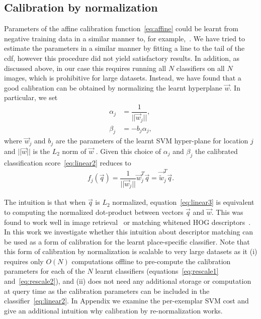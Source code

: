   \subsection{Calibration by normalization}
  \label{sec:calibration_by_renormalization}
  Parameters of the affine calibration function~\eqref{eq:affine} could be learnt from negative training data in a similar manner to, for example,~\cite{Aubry14}. 
  We have tried to estimate the parameters in a similar manner by fitting a line to the tail of the cdf, however this procedure did not yield satisfactory results.
  In addition, as discussed above, in our case this requires running all $N$ classifiers on all $N$ images, which is prohibitive for large datasets.
  Instead, we have found that a good calibration can be obtained by normalizing the learnt hyperplane $\vec{w}$. In particular, we set 
    \begin{align}
      \label{eq:rescale1}
      \alpha_j &= \dfrac{1}{||\vec{w}_j||},\\ 
      \label{eq:rescale2}
      \beta_j &=  -b_j \alpha_j, 
    \end{align}
  where $\vec{w}_j$ and $b_j$ are the parameters of the learnt SVM hyper-plane for location $j$ and $||\vec{w}||$ is the $L_2$ norm of $\vec{w}$ . Given this choice of $\alpha_j$ and $\beta_j$ the calibrated classification score~\eqref{eq:linear2} reduces to
      \begin{align}
        f_j(\vec{q}) = \dfrac{1}{||\vec{w}_j||}\vec{w}_j^T\vec{q} = \vec{\widetilde{w}}_j^T\vec{q}.
            \label{eq:linear3}
     \end{align}

  The intuition is that when $\vec{q}$ is $L_2$ normalized, equation~\eqref{eq:linear3} is equivalent to computing the normalized dot-product between vectors $\vec{q}$ and $\vec{w}$.       This was found to work well in image retrieval~\cite{Sivic03} or matching whitened HOG descriptors~\cite{Doersch13}.
  In this work we investigate whether this intuition about descriptor matching can be used as a form of calibration for the learnt place-specific classifier.  
  Note  that this form of calibration by normalization is scalable to very large datasets as it (i) requires only $O(N)$ computations offline to pre-compute the calibration parameters for each of the $N$ learnt classifiers (equations~\eqref{eq:rescale1} and~\eqref{eq:rescale2}), and (ii) does not need any additional storage or computation at query time as the calibration parameters can be included in the classifier~\eqref{eq:linear2}. 
  In Appendix we examine the per-exemplar SVM cost and give an additional intuition why calibration by re-normalization works.




